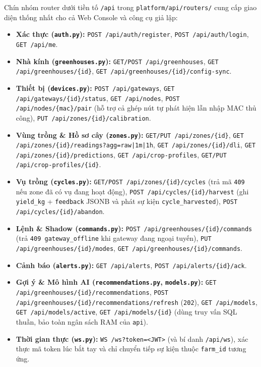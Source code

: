 Chín nhóm router dưới tiền tố \texttt{/api} trong \texttt{platform/api/routers/} cung cấp giao diện thống nhất cho cả Web Console và công cụ giả lập:
\begin{itemize}[leftmargin=*]
    \item \textbf{Xác thực (\texttt{auth.py}):} \texttt{POST /api/auth/register}, \texttt{POST /api/auth/login}, \texttt{GET /api/me}.
    \item \textbf{Nhà kính (\texttt{greenhouses.py}):} \texttt{GET/POST /api/greenhouses}, \texttt{GET /api/greenhouses/\{id\}}, \texttt{GET /api/greenhouses/\{id\}/config-sync}.
    \item \textbf{Thiết bị (\texttt{devices.py}):} \texttt{POST /api/gateways}, \texttt{GET /api/gateways/\{id\}/status}, \texttt{GET /api/nodes}, \texttt{POST /api/nodes/\{mac\}/pair} (hỗ trợ cả ghép nút tự phát hiện lẫn nhập MAC thủ công), \texttt{PUT /api/zones/\{id\}/calibration}.
    \item \textbf{Vùng trồng \& Hồ sơ cây (\texttt{zones.py}):} \texttt{GET/PUT /api/zones/\{id\}}, \texttt{GET /api/zones/\{id\}/readings?agg=raw|1m|1h}, \texttt{GET /api/zones/\{id\}/dli}, \texttt{GET /api/zones/\{id\}/predictions}, \texttt{GET /api/crop-profiles}, \texttt{GET/PUT /api/crop-profiles/\{id\}}.
    \item \textbf{Vụ trồng (\texttt{cycles.py}):} \texttt{GET/POST /api/zones/\{id\}/cycles} (trả mã \texttt{409} nếu zone đã có vụ đang hoạt động), \texttt{POST /api/cycles/\{id\}/harvest} (ghi \texttt{yield\_kg} + \texttt{feedback} JSONB và phát sự kiện \texttt{cycle\_harvested}), \texttt{POST /api/cycles/\{id\}/abandon}.
    \item \textbf{Lệnh \& Shadow (\texttt{commands.py}):} \texttt{POST /api/greenhouses/\{id\}/commands} (trả \texttt{409 gateway\_offline} khi gateway đang ngoại tuyến), \texttt{PUT /api/greenhouses/\{id\}/modes}, \texttt{GET /api/greenhouses/\{id\}/commands}.
    \item \textbf{Cảnh báo (\texttt{alerts.py}):} \texttt{GET /api/alerts}, \texttt{POST /api/alerts/\{id\}/ack}.
    \item \textbf{Gợi ý \& Mô hình AI (\texttt{recommendations.py}, \texttt{models.py}):} \texttt{GET /api/greenhouses/\{id\}/recommendations}, \texttt{POST /api/greenhouses/\{id\}/recommendations/refresh} (\texttt{202}), \texttt{GET /api/models}, \texttt{GET /api/models/active}, \texttt{GET /api/models/\{id\}} (dùng truy vấn SQL thuần, bảo toàn ngân sách RAM của \texttt{api}).
    \item \textbf{Thời gian thực (\texttt{ws.py}):} \texttt{WS /ws?token=<JWT>} (và bí danh \texttt{/api/ws}), xác thực mã token lúc bắt tay và chỉ chuyển tiếp sự kiện thuộc \texttt{farm\_id} tương ứng.
\end{itemize}

